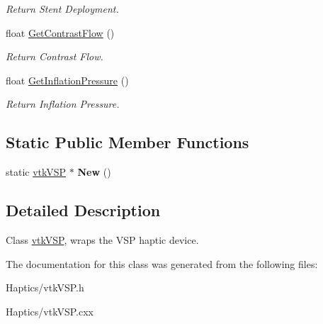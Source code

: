 \begin{DoxyCompactItemize}
\begin{DoxyCompactList}\small\item\em Return Stent Deployment. \item\end{DoxyCompactList}\item 
\hypertarget{classvtkVSP_a36c67b53377b842de0baa568b62cea8a}{
float \hyperlink{classvtkVSP_a36c67b53377b842de0baa568b62cea8a}{GetContrastFlow} ()}
\label{classvtkVSP_a36c67b53377b842de0baa568b62cea8a}

\begin{DoxyCompactList}\small\item\em Return Contrast Flow. \item\end{DoxyCompactList}\item 
\hypertarget{classvtkVSP_a75642238e29ebd171de9c9786eac0361}{
float \hyperlink{classvtkVSP_a75642238e29ebd171de9c9786eac0361}{GetInflationPressure} ()}
\label{classvtkVSP_a75642238e29ebd171de9c9786eac0361}

\begin{DoxyCompactList}\small\item\em Return Inflation Pressure. \item\end{DoxyCompactList}\end{DoxyCompactItemize}
\subsection*{Static Public Member Functions}
\begin{DoxyCompactItemize}
\item 
\hypertarget{classvtkVSP_a0b460a3fa8f71d1b027471d7e171c68e}{
static \hyperlink{classvtkVSP}{vtkVSP} $\ast$ {\bfseries New} ()}
\label{classvtkVSP_a0b460a3fa8f71d1b027471d7e171c68e}

\end{DoxyCompactItemize}


\subsection{Detailed Description}
Class \hyperlink{classvtkVSP}{vtkVSP}, wraps the VSP haptic device. 

The documentation for this class was generated from the following files:\begin{DoxyCompactItemize}
\item 
Haptics/vtkVSP.h\item 
Haptics/vtkVSP.cxx\end{DoxyCompactItemize}
